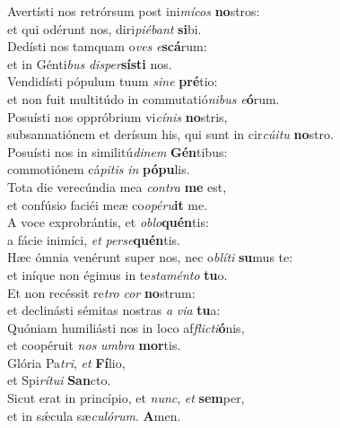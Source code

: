 \evenverse Avertísti nos retrórsum post ini\textit{mí}\textit{cos} \textbf{no}stros:~\*\\
\evenverse et qui odérunt nos, diri\textit{pi}\textit{é}\textit{bant} \textbf{si}bi.\\
\oddverse Dedísti nos tamquam o\textit{ves} \textit{e}\textbf{scá}rum:~\*\\
\oddverse et in Génti\textit{bus} \textit{di}\textit{sper}\textbf{sí}\textbf{sti} nos.\\
\evenverse Vendidísti pópulum tuum \textit{si}\textit{ne} \textbf{pré}tio:~\*\\
\evenverse et non fuit multitúdo in commutatió\textit{ni}\textit{bus} \textit{e}\textbf{ó}rum.\\
\oddverse Posuísti nos oppróbrium vi\textit{cí}\textit{nis} \textbf{no}stris,~\*\\
\oddverse subsannatiónem et derísum his, qui sunt in cir\textit{cú}\textit{i}\textit{tu} \textbf{no}stro.\\
\evenverse Posuísti nos in similitú\textit{di}\textit{nem} \textbf{Gén}tibus:~\*\\
\evenverse commotiónem cá\textit{pi}\textit{tis} \textit{in} \textbf{pó}\textbf{pu}lis.\\
\oddverse Tota die verecúndia mea \textit{con}\textit{tra} \textbf{me} est,~\*\\
\oddverse et confúsio faciéi meæ co\textit{o}\textit{pé}\textit{ru}\textbf{it} me.\\
\evenverse A voce exprobrántis, et \textit{o}\textit{blo}\textbf{quén}tis:~\*\\
\evenverse a fácie inimíci, \textit{et} \textit{per}\textit{se}\textbf{quén}tis.\\
\oddverse Hæc ómnia venérunt super nos, nec o\textit{blí}\textit{ti} \textbf{su}mus te:~\*\\
\oddverse et iníque non égimus in te\textit{sta}\textit{mén}\textit{to} \textbf{tu}o.\\
\evenverse Et non recéssit re\textit{tro} \textit{cor} \textbf{no}strum:~\*\\
\evenverse et declinásti sémitas nostras \textit{a} \textit{vi}\textit{a} \textbf{tu}a:\\
\oddverse Quóniam humiliásti nos in loco af\textit{fli}\textit{cti}\textbf{ó}nis,~\*\\
\oddverse et coopéruit \textit{nos} \textit{um}\textit{bra} \textbf{mor}tis.\\
\evenverse Glória Pa\textit{tri}, \textit{et} \textbf{Fí}lio,~\*\\
\evenverse et Spi\textit{rí}\textit{tu}\textit{i} \textbf{San}cto.\\
\oddverse Sicut erat in princípio, et \textit{nunc}, \textit{et} \textbf{sem}per,~\*\\
\oddverse et in sǽcula sæ\textit{cu}\textit{ló}\textit{rum}. \textbf{A}men.\\
